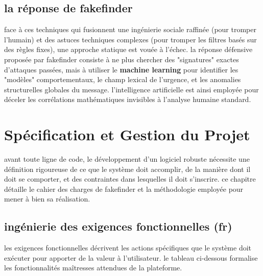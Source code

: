 \documentclass[12pt,a4paper]{report}
\begin{document}
\section{la réponse de fakefinder}
face à ces techniques qui fusionnent une ingénierie sociale raffinée (pour tromper l'humain) et des astuces techniques complexes (pour tromper les filtres basés sur des règles fixes), une approche statique est vouée à l'échec. la réponse défensive proposée par fakefinder consiste à ne plus chercher des "signatures" exactes d'attaques passées, mais à utiliser le \textbf{machine learning} pour identifier les "modèles" comportementaux, le champ lexical de l'urgence, et les anomalies structurelles globales du message. l'intelligence artificielle est ainsi employée pour déceler les corrélations mathématiques invisibles à l'analyse humaine standard.


\chapter{Spécification et Gestion du Projet}

avant toute ligne de code, le développement d'un logiciel robuste nécessite une définition rigoureuse de ce que le système doit accomplir, de la manière dont il doit se comporter, et des contraintes dans lesquelles il doit s'inscrire. ce chapitre détaille le cahier des charges de fakefinder et la méthodologie employée pour mener à bien sa réalisation.

\section{ingénierie des exigences fonctionnelles (fr)}
les exigences fonctionnelles décrivent les actions spécifiques que le système doit exécuter pour apporter de la valeur à l'utilisateur. le tableau ci-dessous formalise les fonctionnalités maîtresses attendues de la plateforme.
\end{document}
